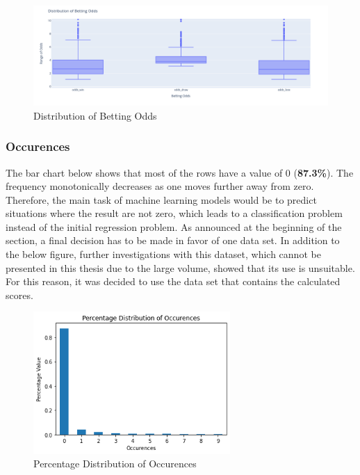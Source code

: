 \begin{figure}[H]
    \centering
    \label{fig:distribution_of_betting_odds}
    \includegraphics[width=16.5cm]{chapter/4_implementation/section/2_data/section/figures/distribution_of_betting_odds.png}
    \captionsetup{justification=centering}
    \caption{Distribution of Betting Odds}
\end{figure}

\subsubsection{Occurences}

The bar chart below shows that most of the rows have a value of 0 (\textbf{87.3\%}). The frequency monotonically decreases as one moves further away from zero. Therefore, the main task of machine learning models would be to predict situations where the result are not zero, which leads to a classification problem instead of the initial regression problem. As announced at the beginning of the section, a final decision has to be made in favor of one data set. In addition to the below figure, further investigations with this dataset, which cannot be presented in this thesis due to the large volume, showed that its use is unsuitable. For this reason, it was decided to use the data set that contains the calculated scores.

\begin{figure}[H]
    \centering
    \label{fig:percentage_distribution_of_occurrences}
    \includegraphics[width=7.5cm]{chapter/4_implementation/section/2_data/section/figures/percentage_distribution_of_occurences.png}
    \captionsetup{justification=centering}
    \caption{Percentage Distribution of Occurences}
\end{figure}

